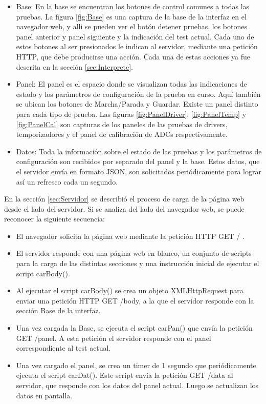 \begin{itemize}
	\item Base: En la base se encuentran los botones de control comunes a todas las pruebas. La figura \ref{fig:Base} es una captura de la base de la interfaz en el navegador web, y alli se pueden ver el botón detener pruebas, los botones panel anterior y panel siguiente y la indicación del test actual. Cada uno de estos botones al ser presionados le indican al servidor, mediante una petición HTTP, que debe producirse una acción. Cada una de estas acciones ya fue descrita en la sección \ref{sec:Interprete}.
	\item Panel: El panel es el espacio donde se visualizan todas las indicaciones de estado y los parámetros de configuración de la prueba en curso. Aquí también se ubican los botones de Marcha/Parada y Guardar. Existe un panel distinto para cada tipo de prueba. Las figuras \ref{fig:PanelDriver}, \ref{fig:PanelTemp} y \ref{fig:PanelCal} son capturas de los paneles de las pruebas de drivers, temporizadores y el panel de calibración de ADCs respectivamente.

	\item Datos: Toda la información sobre el estado de las pruebas y los parámetros de configuración son recibidos por separado del panel y la base. Estos datos, que el servidor envía en formato JSON, son solicitados periódicamente para lograr así un refresco cada un segundo.
\end{itemize}

En la sección \ref{sec:Servidor} se describió el proceso de carga de la página web desde el lado del servidor. Si se analiza del lado del navegador web, se puede reconocer la siguiente secuencia:

\begin{itemize}
	\item El navegador solicita la página web mediante la petición HTTP GET / .
	\item El servidor responde con una página web en blanco, un conjunto de scripts para la carga de las distintas secciones y una instrucción inicial de ejecutar el script carBody().
	\item Al ejecutar el script carBody() se crea un objeto XMLHttpRequest para enviar una petición HTTP GET /body, a la que el servidor responde con la sección Base de la interfaz.
	\item Una vez cargada la Base, se ejecuta el script carPan() que envía la petición GET /panel. A esta petición el servidor responde con el panel correspondiente al test actual.
	\item Una vez cargado el panel, se crea un timer de 1 segundo que periódicamente ejecuta el script carDat(). Este script envía la petición GET /data al servidor, que responde con los datos del panel actual. Luego se actualizan los datos en pantalla.
\end{itemize}

